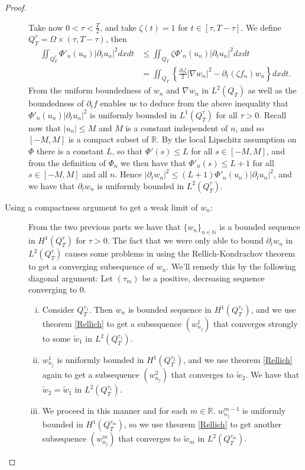 \documentclass[11pt, a4paper]{article}
\begin{document}
\begin{proof}
\begin{description}
	Take now $0<\tau < \frac{T}{2}$, and take $\zeta(t)=1$ for $t\in [\tau, T-\tau]$. We define $Q_T^\tau = \Omega \times (\tau, T - \tau)$, then
	\begin{align*}
	\iint_{Q_T^\tau}\Phi'_n(u_n)|\partial_t u_n|^2 dxdt & \leq \iint_{Q_T}\zeta\Phi'_n(u_n)|\partial_t u_n|^2 dxdt \\
	&= \iint_{Q_T} \left\{ \frac{\partial_t \zeta}{2}|\nabla w_n|^2 - \partial_t(\zeta f_n) w_n \right\} dxdt.
	\end{align*}
	From the uniform boundedness of $w_n$ and $\nabla w_n$ in $L^2(Q_T)$ as well as the boundedness of $\partial_t f$ enables us to deduce from the above inequality that $\Phi'_n(u_n)|\partial_t u_n|^2$ is uniformly bounded in $L^1(Q_T^\tau)$ for all $\tau > 0$.
	Recall now that $|u_n| \leq M$ and $M$ is a constant independent of $n$, and so $[-M,M]$ is a compact subset of $\mathbb{R}$. By the local Lipschitz assumption on $\Phi$ there is a constant $L$, so that $\Phi'(s)\leq L$ for all $s\in [-M,M]$, and from the definition of $\Phi_n$ we then have that $\Phi'_n(s) \leq L + 1$ for all $s \in [-M,M]$ and all $n$. Hence $|\partial_t w_n|^2 \leq (L+1)\Phi'_n(u_n)|\partial_t u_n|^2$, and we have that $\partial_t w_n$ is uniformly bounded in $L^2(Q_T^\tau)$.
	
	
	\item[Using a compactness argument to get a weak limit of $w_n$:]From the two previous parts we have that $\{w_n\}_{n \in \mathbb{N}}$ is a bounded sequence in $H^1(Q_T^\tau)$ for $\tau >0$. The fact that we were only able to bound $\partial_t w_n$ in $L^2(Q_T^\tau)$ causes some problems in using the Rellich-Kondrachov theorem to get a converging subsequence of $w_n$. We'll remedy this by the following diagonal argument:
	Let $(\tau_m)$ be a positive, decreasing sequence converging to $0$.
	\begin{enumerate}[i)]
	\item Consider $Q_T^{\tau_1}$. Then $w_n$ is bounded sequence in $H^1(Q_T^{\tau_1})$, and we use theorem \ref{Rellich} to get a subsequence $(w_{n_j}^1)$ that converges strongly to some $\tilde{w}_1$ in $L^2(Q_T^{\tau_1})$.
	
	\item $w_{n_j}^1$ is uniformly bounded in $H^1(Q_T^{\tau_2})$, and we use theorem \ref{Rellich} again to get a subsequence $(w_{n_j}^2)$ that converges to $\tilde{w}_2$. We have that $\tilde{w}_2 = \tilde{w}_1$ in $L^2(Q_T^{\tau_1})$.
	
	\item We proceed in this manner and for each $m \in \mathbb{R}$. $w_{n_j}^{m-1}$ is uniformly bounded in $H^1(Q_T^{\tau_m})$, so we use theorem \ref{Rellich} to get another subsequence $(w_{n_j}^m)$ that converges to $\tilde{w}_m$ in $L^2(Q_T^{\tau_m})$.
	

\end{enumerate}
\end{description}
\end{proof}
\end{document}
